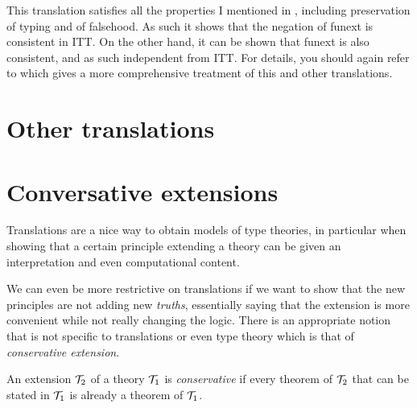 This translation satisfies all the properties I mentioned in
, including preservation of typing and of falsehood.
As such it shows that the negation of \acrshort{funext} is consistent in
\acrshort{ITT}. On the other hand, it can be shown that \acrshort{funext} is
also consistent, and as such independent from \acrshort{ITT}.
For details, you should again refer to
which gives a more comprehensive treatment of this and other translations.

\section{Other translations}


\section{Conversative extensions}

Translations are a nice way to obtain models of type theories, in particular
when showing that a certain principle extending a theory can be given an
interpretation and even computational content.

We can even be more restrictive on translations if we want to show that the new
principles are not adding new \emph{truths}, essentially saying that the
extension is more convenient while not really changing the logic.
There is an appropriate notion that is not specific to translations or even
type theory which is that of \emph{conservative extension}.

\begin{definition}
  An extension \(\mathcal{T}_2\) of a theory \(\mathcal{T}_1\) is \emph{conservative} if every
  theorem of \(\mathcal{T}_2\) that can be stated in \(\mathcal{T}_1\) is already a theorem of
  \(\mathcal{T}_1\).
\end{definition}

